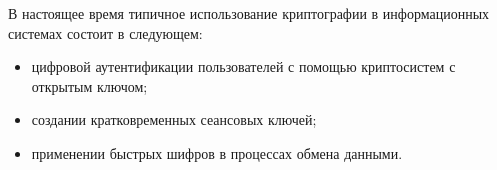 В настоящее время типичное использование криптографии в информационных системах состоит в следующем:
\begin{itemize}
\item цифровой аутентификации пользователей с помощью криптосистем с открытым ключом;
\item создании кратковременных сеансовых ключей;
\item применении быстрых шифров в процессах обмена данными.
\end{itemize}
